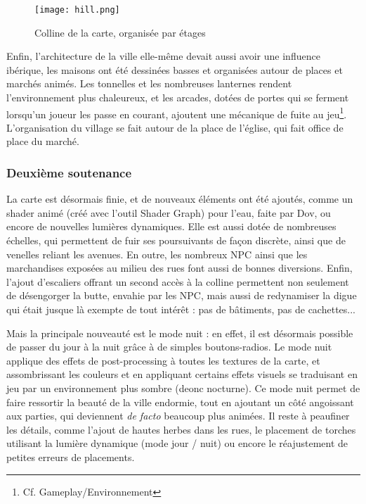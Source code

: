     \begin{figure}[hbt!]
        \centering
        \texttt{[image: hill.png]}
        \caption{Colline de la carte, organisée par étages}
    \end{figure}
    \FloatBarrier

    Enfin, l’architecture de la ville elle-même devait aussi avoir une influence 
    ibérique, les maisons ont été dessinées basses et organisées autour de places et 
    marchés animés. Les tonnelles et les nombreuses lanternes rendent l’environnement 
    plus chaleureux, et les arcades, dotées de portes qui se ferment lorsqu’un joueur 
    les passe en courant, ajoutent une mécanique de fuite au jeu\footnote{Cf. Gameplay/Environnement}. L’organisation du 
    village se fait autour de la place de l’église, qui fait office de place du marché.

\vspace{0.5cm}
\subsubsection{Deuxième soutenance}
\vspace{0.5cm}

    La carte est désormais finie, et de nouveaux éléments ont été ajoutés, comme un shader animé (créé avec l'outil Shader Graph) pour l'eau,
    faite par Dov, ou encore de nouvelles lumières dynamiques. Elle est aussi dotée de nombreuses échelles, qui permettent de fuir ses poursuivants 
    de façon discrète, ainsi que de venelles reliant les avenues.
    En outre, les nombreux NPC ainsi que les marchandises exposées au milieu des rues font aussi de bonnes diversions.
    Enfin, l'ajout d'escaliers offrant un second accès à la colline permettent non seulement de désengorger la butte, envahie par les NPC, mais aussi 
    de redynamiser la digue qui était jusque là exempte de tout intérêt : pas de bâtiments, pas de cachettes...
    
    Mais la principale nouveauté est le mode nuit : en effet, il est désormais possible de passer du jour à la nuit grâce à de simples boutons-radios. 
    Le mode nuit applique des effets de post-processing à toutes les textures de la carte, et assombrissant les couleurs et en appliquant certains effets 
    visuels se traduisant en jeu par un environnement plus sombre (deonc nocturne). 
    Ce mode nuit permet de faire ressortir la beauté de la ville endormie, tout en ajoutant un côté angoissant aux parties,
    qui deviennent \textit{de facto} beaucoup plus animées.
    Il reste à peaufiner les détails, comme l'ajout de hautes herbes dans les rues, le placement de torches utilisant 
    la lumière dynamique (mode jour / nuit) ou encore le réajustement de petites erreurs de placements.

